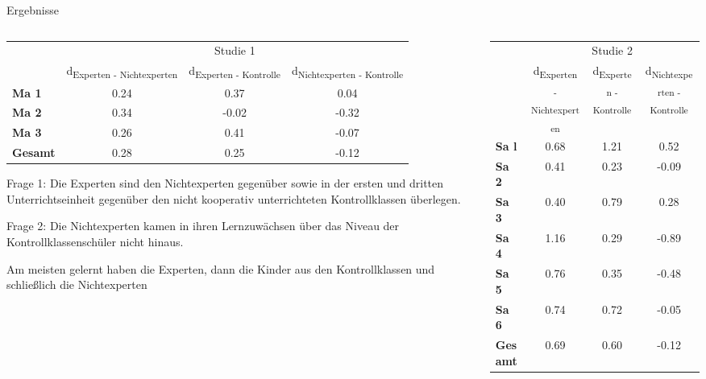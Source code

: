 \begin{alertblock}{Ergebnisse} %
\begin{columns}[t,totalwidth=\twocolwid] %

\begin{column}{\onecolwid}
\begin{table}
\begin{tabular}{lccc}
 & \multicolumn{3}{c}{Studie 1} \\
\cmidrule{2-4}
 & d\textsubscript{Experten - Nichtexperten} & d\textsubscript{Experten - Kontrolle} & d\textsubscript{Nichtexperten - Kontrolle} \\
\midrule 
\textbf{Ma 1} & 0.24 & 0.37 & 0.04 \\
\textbf{Ma 2} & 0.34 & -0.02 & -0.32 \\
\textbf{Ma 3} & 0.26 & 0.41 & -0.07 \\
\midrule 
\textbf{Gesamt} & 0.28 & 0.25 & -0.12 \\
\bottomrule
\end{tabular}
\end{table}

\justifying 
Frage 1: Die Experten sind den Nichtexperten gegenüber sowie in der ersten und dritten Unterrichtseinheit gegenüber den nicht kooperativ unterrichteten Kontrollklassen überlegen.
 
Frage 2: Die Nichtexperten kamen in ihren Lernzuwächsen über das Niveau 
der Kontrollklassenschüler nicht hinaus.

Am meisten gelernt haben die Experten, dann die Kinder aus den Kontrollklassen und schließlich die Nichtexperten
 
\end{column}

\begin{column}{\onecolwid}
\begin{table}
\begin{tabular}{lccc}
 & \multicolumn{3}{c}{Studie 2} \\
\cmidrule{2-4}
 & d\textsubscript{Experten - Nichtexperten} & d\textsubscript{Experten - Kontrolle} & d\textsubscript{Nichtexperten - Kontrolle} \\
\midrule 
\textbf{Sa l} & 0.68 & 1.21 & 0.52 \\
\textbf{Sa 2} & 0.41 & 0.23 & -0.09 \\
\textbf{Sa 3} & 0.40 & 0.79 & 0.28 \\
\textbf{Sa 4} & 1.16 & 0.29 & -0.89 \\
\textbf{Sa 5} & 0.76 & 0.35 & -0.48 \\
\textbf{Sa 6} & 0.74 & 0.72 & -0.05 \\
\midrule 
\textbf{Gesamt} & 0.69 & 0.60 & -0.12 \\
\bottomrule
\end{tabular} 
\end{table}


\end{column}
\end{columns}
\end{alertblock}
